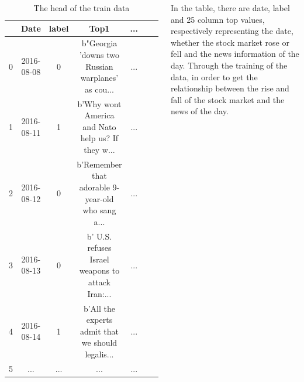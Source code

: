 \documentclass{tikzposter} %
\begin{document}
\begin{columns}
{  \begin{table}[htbp]  \centering
    \caption{The head of the train data}
    \label{tbl:data information}
    \begin{tabular}{ccccccc}
      \hline
      & Date & label & Top1 & ...\\
      \hline
      0 & 2016-08-08    & 0     & b"Georgia 'downs two Russian warplanes' as cou... & ...\\
      1 & 2016-08-11    & 1     & b'Why wont America and Nato help us? If they w... & ...\\
      2 & 2016-08-12    & 0     & b'Remember that adorable 9-year-old who sang a... & ...\\
      3 & 2016-08-13    & 0     & b' U.S. refuses Israel weapons to attack Iran:... & ...\\
      4 & 2016-08-14    & 1     & b'All the experts admit that we should legalis... & ...\\
      5 & ...           & ...   & ...                                               & ...\\
          \hline 
    \end{tabular}
  \end{table}

  In the table, there are date, label and 25 column top values, 
respectively representing the date, 
whether the stock market rose or fell and 
the news information of the day.
Through the training of the data, 
in order to get the relationship between 
the rise and fall of the stock market and the news of the day.
}



\end{columns}
\end{document}
